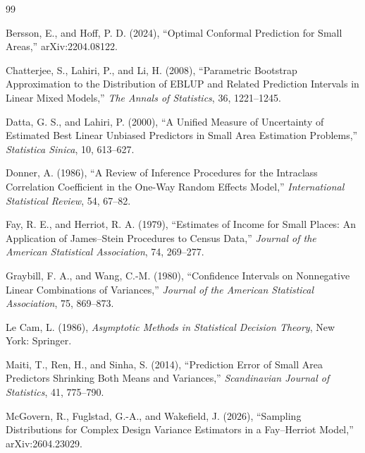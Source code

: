 \begin{thebibliography}{99}

Bersson, E., and Hoff, P. D. (2024), ``Optimal Conformal Prediction for Small
Areas,'' arXiv:2204.08122.

Chatterjee, S., Lahiri, P., and Li, H. (2008), ``Parametric Bootstrap
Approximation to the Distribution of EBLUP and Related Prediction Intervals in
Linear Mixed Models,'' \emph{The Annals of Statistics}, 36, 1221--1245.

Datta, G. S., and Lahiri, P. (2000), ``A Unified Measure of Uncertainty of
Estimated Best Linear Unbiased Predictors in Small Area Estimation Problems,''
\emph{Statistica Sinica}, 10, 613--627.

Donner, A. (1986), ``A Review of Inference Procedures for the Intraclass
Correlation Coefficient in the One-Way Random Effects Model,'' \emph{International
Statistical Review}, 54, 67--82.

Fay, R. E., and Herriot, R. A. (1979), ``Estimates of Income for Small Places: An
Application of James--Stein Procedures to Census Data,'' \emph{Journal of the
American Statistical Association}, 74, 269--277.

Graybill, F. A., and Wang, C.-M. (1980), ``Confidence Intervals on Nonnegative
Linear Combinations of Variances,'' \emph{Journal of the American Statistical
Association}, 75, 869--873.

Le Cam, L. (1986), \emph{Asymptotic Methods in Statistical Decision Theory}, New
York: Springer.

Maiti, T., Ren, H., and Sinha, S. (2014), ``Prediction Error of Small Area
Predictors Shrinking Both Means and Variances,'' \emph{Scandinavian Journal of
Statistics}, 41, 775--790.

McGovern, R., Fuglstad, G.-A., and Wakefield, J. (2026), ``Sampling Distributions
for Complex Design Variance Estimators in a Fay--Herriot Model,''
arXiv:2604.23029.


\end{thebibliography}
